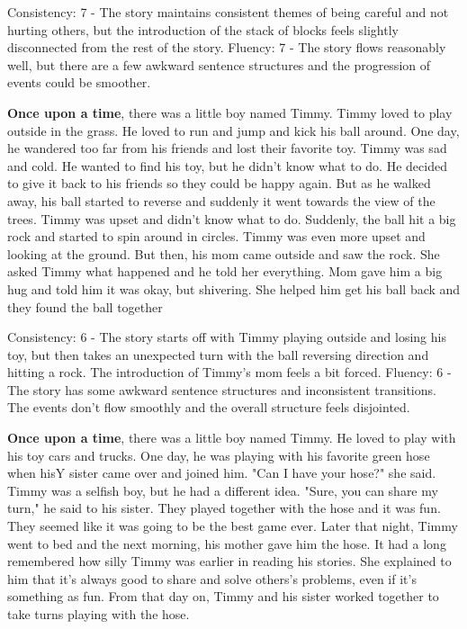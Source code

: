 \documentclass{article}
\begin{document}
Consistency: 7 - The story maintains consistent themes of being careful and not hurting others, but the introduction of the stack of blocks feels slightly disconnected from the rest of the story.
Fluency: 7 - The story flows reasonably well, but there are a few awkward sentence structures and the progression of events could be smoother.

\textbf{Once upon a time}, there was a little boy named Timmy. Timmy loved to play outside in the grass. He loved to run and jump and kick his ball around. One day, he wandered too far from his friends and lost their favorite toy. Timmy was sad and cold. He wanted to find his toy, but he didn't know what to do. He decided to give it back to his friends so they could be happy again. But as he walked away, his ball started to reverse and suddenly it went towards the view of the trees. Timmy was upset and didn't know what to do. Suddenly, the ball hit a big rock and started to spin around in circles. Timmy was even more upset and looking at the ground. But then, his mom came outside and saw the rock. She asked Timmy what happened and he told her everything. Mom gave him a big hug and told him it was okay, but shivering. She helped him get his ball back and they found the ball together

Consistency: 6 - The story starts off with Timmy playing outside and losing his toy, but then takes an unexpected turn with the ball reversing direction and hitting a rock. The introduction of Timmy's mom feels a bit forced.
Fluency: 6 - The story has some awkward sentence structures and inconsistent transitions. The events don't flow smoothly and the overall structure feels disjointed.

\textbf{Once upon a time}, there was a little boy named Timmy. He loved to play with his toy cars and trucks. One day, he was playing with his favorite green hose when hisY sister came over and joined him. "Can I have your hose?" she said. Timmy was a selfish boy, but he had a different idea. "Sure, you can share my turn," he said to his sister. They played together with the hose and it was fun. They seemed like it was going to be the best game ever. Later that night, Timmy went to bed and the next morning, his mother gave him the hose. It had a long remembered how silly Timmy was earlier in reading his stories. She explained to him that it's always good to share and solve others's problems, even if it's something as fun. From that day on, Timmy and his sister worked together to take turns playing with the hose.
\end{document}
